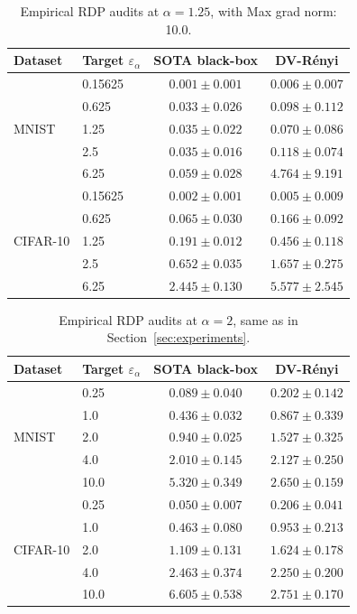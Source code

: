 \documentclass{article}
\theoremstyle{plain}
\theoremstyle{definition}
\theoremstyle{remark}
\begin{document}
\begin{table}[t]
\centering
\caption{Empirical RDP audits at $\alpha=1.25$, with Max grad norm: 10.0.}
\label{tab:alpha125-10.0}
\begin{tabular}{llcc}
\toprule
Dataset & Target $\varepsilon_\alpha$ & SOTA black-box \cite{muthu2024nearly} & DV-R\'enyi \\
\midrule
\multirow{5}{*}{MNIST} & 0.15625 & $0.001 \pm 0.001$ & $\mathbf{0.006} \pm 0.007$ \\
 & 0.625 & $0.033 \pm 0.026$ & $\mathbf{0.098} \pm 0.112$ \\
 & 1.25 & $0.035 \pm 0.022$ & $\mathbf{0.070} \pm 0.086$ \\
 & 2.5 & $0.035 \pm 0.016$ & $\mathbf{0.118} \pm 0.074$ \\
 & 6.25 & $0.059 \pm 0.028$ & $\mathbf{4.764} \pm 9.191$ \\
\midrule
\multirow{5}{*}{CIFAR-10} & 0.15625 & $0.002 \pm 0.001$ & $\mathbf{0.005} \pm 0.009$ \\
 & 0.625 & $0.065 \pm 0.030$ & $\mathbf{0.166} \pm 0.092$ \\
 & 1.25 & $0.191 \pm 0.012$ & $\mathbf{0.456} \pm 0.118$ \\
 & 2.5 & $0.652 \pm 0.035$ & $\mathbf{1.657} \pm 0.275$ \\
 & 6.25 & $2.445 \pm 0.130$ & $\mathbf{5.577} \pm 2.545$ \\
\bottomrule
\end{tabular}
\end{table}




\begin{table}[t]
\centering
\caption{Empirical RDP audits at $\alpha=2$, same as in Section~\ref{sec:experiments}.}
\label{tab:alpha2-1.0}
\begin{tabular}{llcc}
\toprule
Dataset & Target $\varepsilon_\alpha$ & SOTA black-box \cite{muthu2024nearly} & DV-R\'enyi \\
\midrule
\multirow{5}{*}{MNIST} & 0.25 & $0.089 \pm 0.040$ & $\mathbf{0.202} \pm 0.142$ \\
 & 1.0 & $0.436 \pm 0.032$ & $\mathbf{0.867} \pm 0.339$ \\
 & 2.0 & $0.940 \pm 0.025$ & $\mathbf{1.527} \pm 0.325$ \\
 & 4.0 & $2.010 \pm 0.145$ & $\mathbf{2.127} \pm 0.250$ \\
 & 10.0 & $\mathbf{5.320} \pm 0.349$ & $2.650 \pm 0.159$ \\
\midrule
\multirow{5}{*}{CIFAR-10} & 0.25 & $0.050 \pm 0.007$ & $\mathbf{0.206} \pm 0.041$ \\
 & 1.0 & $0.463 \pm 0.080$ & $\mathbf{0.953} \pm 0.213$ \\
 & 2.0 & $1.109 \pm 0.131$ & $\mathbf{1.624} \pm 0.178$ \\
 & 4.0 & $\mathbf{2.463} \pm 0.374$ & $2.250 \pm 0.200$ \\
 & 10.0 & $\mathbf{6.605} \pm 0.538$ & $2.751 \pm 0.170$ \\
\bottomrule
\end{tabular}
\end{table}
\end{document}
